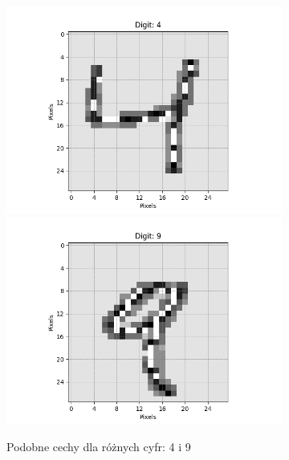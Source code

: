 \documentclass[10pt]{article}
\begin{document}
\begin{figure}[H]\centering
    \begin{subfigure}[t]{.2\textwidth}
        \includegraphics[width=\linewidth]{img/LBP/LBP_4}
        \includegraphics[width=\linewidth]{img/LBP/LBP_9}
        \caption{Podobne cechy dla różnych cyfr: 4 i 9}
    \end{subfigure}
    \hspace{.1\textwidth}
    \begin{subfigure}[t]{.2\textwidth}

\end{subfigure}
\end{figure}
\end{document}
